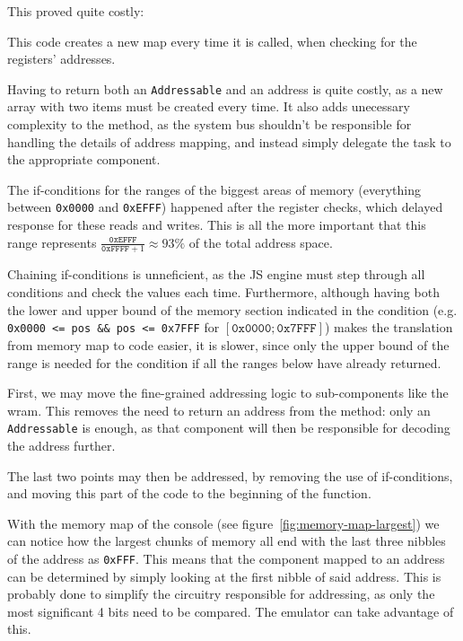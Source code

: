 \documentclass[11pt]{informatics-report}
\begin{document}
This proved quite costly:
\begin{compactitem}
    \item This code creates a new map every time it is called, when checking for the registers' addresses.
    \item Having to return both an \texttt{Addressable} and an address is quite costly, as a new array with two items must be created every time. It also adds unecessary complexity to the method, as the system bus shouldn't be responsible for handling the details of address mapping, and instead simply delegate the task to the appropriate component.
    \item The if-conditions for the ranges of the biggest areas of memory (everything between \texttt{0x0000} and \texttt{0xEFFF}) happened after the register checks, which delayed response for these reads and writes. This is all the more important that this range represents $\frac{\texttt{0xEFFF}}{\texttt{0xFFFF}+1} \approx 93\%$ of the total address space.
    \item Chaining if-conditions is unneficient, as the JS engine must step through all conditions and check the values each time. Furthermore, although having both the lower and upper bound of the memory section indicated in the condition (e.g. \texttt{0x0000 <= pos \&\& pos <= 0x7FFF} for $[\texttt{0x0000}; \texttt{0x7FFF}]$) makes the translation from memory map to code easier, it is slower, since only the upper bound of the range is needed for the condition if all the ranges below have already returned.
\end{compactitem}

First, we may move the fine-grained addressing logic to sub-components like the \gls{wram}. This removes the need to return an address from the method: only an \texttt{Addressable} is enough, as that component will then be responsible for decoding the address further.

The last two points may then be addressed, by removing the use of if-conditions, and moving this part of the code to the beginning of the function.

With the memory map of the console (see figure~\ref{fig:memory-map-largest}) we can notice how the largest chunks of memory all end with the last three nibbles of the address as \texttt{0xFFF}. This means that the component mapped to an address can be determined by simply looking at the first nibble of said address. This is probably done to simplify the circuitry responsible for addressing, as only the most significant 4 bits need to be compared. The emulator can take advantage of this.
\end{document}
